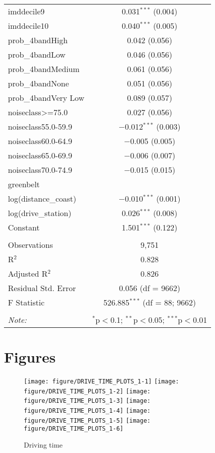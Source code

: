 \documentclass{article}\usepackage[]{graphicx}\usepackage[]{color}
\newenvironment{knitrout}{}{} %
\begin{document}
\begin{table}[!htbp]
\begin{tabular}{@{\extracolsep{5pt}}lc}
  imddecile9 & 0.031$^{***}$ (0.004) \\ 
  imddecile10 & 0.040$^{***}$ (0.005) \\ 
  prob\_4bandHigh & 0.042 (0.056) \\ 
  prob\_4bandLow & 0.046 (0.056) \\ 
  prob\_4bandMedium & 0.061 (0.056) \\ 
  prob\_4bandNone & 0.051 (0.056) \\ 
  prob\_4bandVery Low & 0.089 (0.057) \\ 
  noiseclass\textgreater =75.0 & 0.027 (0.056) \\ 
  noiseclass55.0-59.9 & $-$0.012$^{***}$ (0.003) \\ 
  noiseclass60.0-64.9 & $-$0.005 (0.005) \\ 
  noiseclass65.0-69.9 & $-$0.006 (0.007) \\ 
  noiseclass70.0-74.9 & $-$0.015 (0.015) \\ 
  greenbelt &  \\ 
  log(distance\_coast) & $-$0.010$^{***}$ (0.001) \\ 
  log(drive\_station) & 0.026$^{***}$ (0.008) \\ 
  Constant & 1.501$^{***}$ (0.122) \\ 
 \hline \\[-1.8ex] 
Observations & 9,751 \\ 
R$^{2}$ & 0.828 \\ 
Adjusted R$^{2}$ & 0.826 \\ 
Residual Std. Error & 0.056 (df = 9662) \\ 
F Statistic & 526.885$^{***}$ (df = 88; 9662) \\ 
\hline 
\hline \\[-1.8ex] 
\textit{Note:}  & \multicolumn{1}{r}{$^{*}$p$<$0.1; $^{**}$p$<$0.05; $^{***}$p$<$0.01} \\ 
\end{tabular} 
\end{table} 

\pagebreak
\section{Figures}


\begin{knitrout}\scriptsize
{}\color{fgcolor}\begin{figure}
\texttt{[image: figure/DRIVE\_TIME\_PLOTS\_1-1]} 
\texttt{[image: figure/DRIVE\_TIME\_PLOTS\_1-2]} 
\texttt{[image: figure/DRIVE\_TIME\_PLOTS\_1-3]} 
\texttt{[image: figure/DRIVE\_TIME\_PLOTS\_1-4]} 
\texttt{[image: figure/DRIVE\_TIME\_PLOTS\_1-5]} 
\texttt{[image: figure/DRIVE\_TIME\_PLOTS\_1-6]} \caption[Driving time]{Driving time}\label{fig:DRIVE_TIME_PLOTS_1}
\end{figure}


\end{knitrout}
\end{document}
